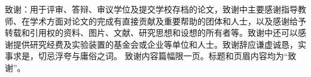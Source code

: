 \begin{thanks}
致谢：用于评审、答辩、审议学位及提交学校存档的论文，致谢中主要感谢指导教师、在学术方面对论文的完成有直接贡献及重要帮助的团体和人士，以及感谢给予转载和引用权的资料、图片、文献、研究思想和设想的所有者等。致谢中还可以感谢提供研究经费及实验装置的基金会或企业等单位和人士。致谢辞应谦虚诚恳，实事求是，切忌浮夸与庸俗之词。
致谢内容篇幅限一页。标题和页眉内容均为“致谢”。
\end{thanks}
